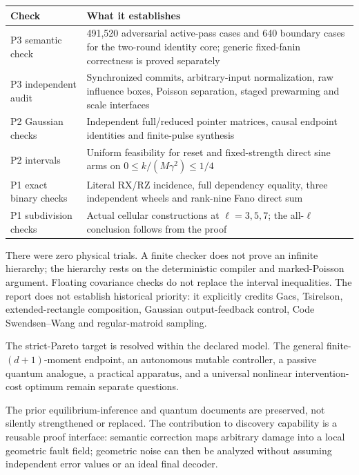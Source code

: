 \documentclass[11pt,a4paper]{article}
\begin{document}
\begin{center}
\begin{tabularx}{\linewidth}{P{34mm}Y}
\toprule
Check & What it establishes\\
\midrule
P3 semantic check & 491,520 adversarial active-pass cases and 640 boundary cases for the two-round identity core; generic fixed-fanin correctness is proved separately\\
P3 independent audit & Synchronized commits, arbitrary-input normalization, raw influence boxes, Poisson separation, staged prewarming and scale interfaces\\
P2 Gaussian checks & Independent full/reduced pointer matrices, causal endpoint identities and finite-pulse synthesis\\
P2 intervals & Uniform feasibility for reset and fixed-strength direct sine arms on $0\le k/(M\gamma^2)\le1/4$\\
P1 exact binary checks & Literal RX/RZ incidence, full dependency equality, three independent wheels and rank-nine Fano direct sum\\
P1 subdivision checks & Actual cellular constructions at $\ell=3,5,7$; the all-$\ell$ conclusion follows from the proof\\
\bottomrule
\end{tabularx}
\end{center}

There were zero physical trials. A finite checker does not prove an infinite hierarchy; the hierarchy rests on the deterministic compiler and marked-Poisson argument. Floating covariance checks do not replace the interval inequalities. The report does not establish historical priority: it explicitly credits Gacs, Tsirelson, extended-rectangle composition, Gaussian output-feedback control, Code Swendsen--Wang and regular-matroid sampling.

The strict-Pareto target is resolved within the declared model. The general finite-$(d+1)$-moment endpoint, an autonomous mutable controller, a passive quantum analogue, a practical apparatus, and a universal nonlinear intervention-cost optimum remain separate questions.

The prior equilibrium-inference and quantum documents are preserved, not silently strengthened or replaced. The contribution to discovery capability is a reusable proof interface: semantic correction maps arbitrary damage into a local geometric fault field; geometric noise can then be analyzed without assuming independent error values or an ideal final decoder.
\end{document}
